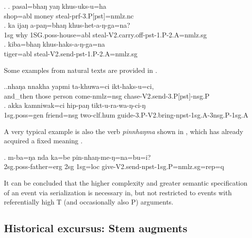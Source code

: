 \ex. \ag. pasal=bhaŋ yaŋ khus-uks-u=ha\\
		shop{\sc =abl} money steal{\sc -prf-3.P[pst]=nmlz.nc}	\\
 	\bg.  ka ijaŋ a-paŋ=bhaŋ khus-het-a-ŋ-ga=na?\\ 
	{\sc 1sg} why {\sc 1SG.poss-}house{\sc =abl} steal{\sc -V2.carry.off-pst-1.P-2.A=nmlz.sg}		\\
	\bg.  kiba=bhaŋ khus-haks-a-ŋ-ga=na\\ 
tiger{\sc =abl} steal{\sc -V2.send-pst-1.P-2.A=nmlz.sg}		\\
	

Some examples from natural texts are provided in \Next.	

\ex.\ag.nhaŋa   nnakha yapmi ta-khuwa=ci       ikt-haks-u=ci,\\
and\_then those person come{\sc -nmlz=nsg} chase{\sc -V2.send-3.P[pst]-nsg.P}\\
 
 	\bg. akka  kamniwak=ci   hip-paŋ tikt-u-ra-wa-ŋ-ci-ŋ\\
{\sc 1sg.poss=gen} friend{\sc =nsg} two{\sc -clf.hum} guide{\sc -3.P-V2.bring-npst-1sg.A-3nsg.P-1sg.A}\\
	  
	
A very typical example is also the verb \emph{pinnhaŋma}  shown in \Next, which has already acquired a fixed meaning .

\exg. m-ba=ŋa nda ka=be pin-nhaŋ-me-ŋ=na=bu=i?\\
{\sc 2sg.poss}-father{\sc =erg} {\sc 2sg} {\sc 1sg=loc}	give{\sc -V2.send-npst-1sg.P=nmlz.sg=rep=q}\\

	
It can be concluded that the higher complexity and greater semantic specification of an event via serialization is necessary in, but not restricted to events with referentially high T (and occasionally also P) arguments.
	
\subsection{Historical excursus: Stem augments}\label{stemchange}

